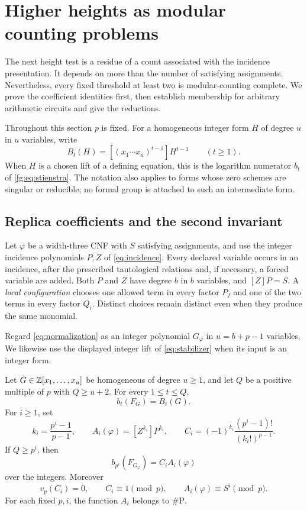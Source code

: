\section{Higher heights as modular counting problems}\label{fg:sec:counting}
The next height test is a residue of a count associated with the incidence
presentation. It depends on more than the number of satisfying assignments.
Nevertheless, every fixed threshold at least two is modular-counting complete.
We prove the coefficient identities first, then establish membership for
arbitrary arithmetic circuits and give the reductions.

Throughout this section $p$ is fixed. For a homogeneous integer form $H$
of degree $u$ in $u$ variables, write
\[
 B_t(H)=[(x_1\cdots x_u)^{t-1}]H^{t-1}\qquad(t\ge1).
\]
When $H$ is a chosen lift of a defining equation, this is the logarithm
numerator $b_t$ of \eqref{fg:eq:stienstra}. The notation also applies to
forms whose zero schemes are singular or reducible; no formal group is
attached to such an intermediate form.

\subsection{Replica coefficients and the second invariant}
Let $\varphi$ be a width-three CNF with $S$ satisfying assignments, and use
the integer incidence polynomials $P,Z$ of \eqref{eq:incidence}. Every
declared variable occurs in an incidence, after the prescribed
tautological relations and, if necessary, a forced variable are added.
Both $P$ and $Z$ have degree $b$ in $b$ variables, and $[Z]P=S$.
A \emph{local configuration} chooses one allowed term in every factor
$P_f$ and one of the two terms in every factor $Q_i$. Distinct choices
remain distinct even when they produce the same monomial.

Regard \eqref{eq:normalization} as an integer polynomial $G_\varphi$ in
$u=b+p-1$ variables. We likewise use the displayed integer lift of
\eqref{eq:stabilizer} when its input is an integer form.

\begin{lemma}\label{fg:lem:replica}
Let $G\in\mathbb Z[x_1,\ldots,x_u]$ be homogeneous of degree $u\ge1$, and let
$Q$ be a positive multiple of $p$ with $Q\ge u+2$.
For every $1\le t\le Q$,
\begin{equation}\label{fg:eq:stabilized-numerator}
 b_t(F_G)=B_t(G).
\end{equation}
For $i\ge1$, set
\[
 k_i=\frac{p^i-1}{p-1},\qquad
 A_i(\varphi)=[Z^{k_i}]P^{k_i},\qquad
 C_i=(-1)^{k_i}\frac{(p^i-1)!}{(k_i!)^{p-1}}.
\]
If $Q\ge p^i$, then
\begin{equation}\label{fg:eq:replica-numerator}
 b_{p^i}(F_{G_\varphi})=C_iA_i(\varphi)
\end{equation}
over the integers. Moreover
\begin{equation}\label{fg:eq:replica-residue}
 v_p(C_i)=0,\qquad C_i\equiv1\pmod p,\qquad
 A_i(\varphi)\equiv S^i\pmod p.
\end{equation}
For each fixed $p,i$, the function $A_i$ belongs to $\#\mathrm P$.
\end{lemma}

